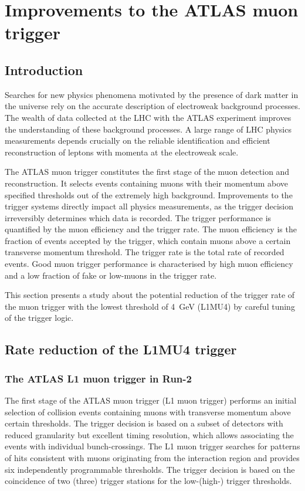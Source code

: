 %
\chapter{Improvements to the ATLAS muon trigger}
\label{sec:trigger}

\section{Introduction}
\label{sec:trigger:introduction}
Searches for new physics phenomena motivated by the presence of dark matter in the universe rely on the accurate description of electroweak background processes. The wealth of data collected at the LHC with the ATLAS experiment improves the understanding of these background processes. A large range of LHC physics measurements depends crucially on the reliable identification and efficient reconstruction of leptons with momenta at the electroweak scale.

The ATLAS muon trigger constitutes the first stage of the muon detection and reconstruction. It selects events containing muons with their momentum above specified thresholds out of the extremely high background. Improvements to the trigger systems directly impact all physics measurements, as the trigger decision irreversibly determines which data is recorded. The trigger performance is quantified by the muon efficiency and the trigger rate. The muon efficiency is the fraction of events accepted by the trigger, which contain muons above a certain transverse momentum threshold. The trigger rate is the total rate of recorded events. Good muon trigger performance is characterised by high muon efficiency and a low fraction of fake or low-\pt muons in the trigger rate.

This section presents a study about the potential reduction of the trigger rate of the muon trigger with the lowest \pt threshold of \SI{4}{\giga\electronvolt} (L1MU4) by careful tuning of the trigger logic.

\section{Rate reduction of the L1MU4 trigger}
\label{ssec:trigger:l1mu4}
\subsection{The ATLAS L1 muon trigger in Run-2}
\label{ssec:trigger:l1mu4:run2}
The first stage of the ATLAS muon trigger (L1 muon trigger) performs an initial selection of collision events containing muons with transverse momentum above certain thresholds. The trigger decision is based on a subset of detectors with reduced granularity but excellent timing resolution, which allows associating the events with individual bunch-crossings. The L1 muon trigger searches for patterns of hits consistent with muons originating from the interaction region and provides six independently programmable \pt thresholds. The trigger decision is based on the coincidence of two (three) trigger stations for the low-\pt (high-\pt) trigger thresholds.

